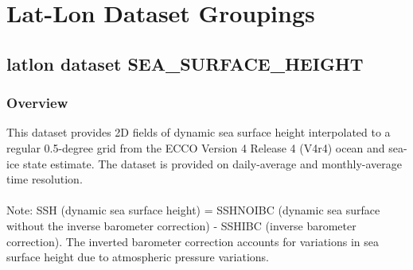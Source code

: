 \section{Lat-Lon Dataset Groupings}
\subsection{latlon dataset SEA\_SURFACE\_HEIGHT}
\newp
\subsubsection{Overview}
This dataset provides 2D fields of dynamic sea surface height interpolated to a regular 0.5-degree grid from the ECCO Version 4 Release 4 (V4r4) ocean and sea-ice state estimate. The dataset is provided on daily-average and monthly-average time resolution.
\\\\
Note: SSH (dynamic sea surface height) = SSHNOIBC (dynamic sea surface without the inverse barometer correction) - SSHIBC (inverse barometer correction). The inverted barometer correction accounts for variations in sea surface height due to atmospheric pressure variations.
\\
